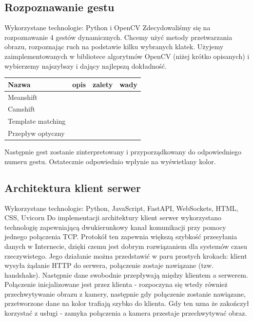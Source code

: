 \documentclass{article}
\begin{document}
\subsection{Rozpoznawanie gestu}
Wykorzystane technologie: Python i OpenCV
Zdecydowaliśmy się na rozpoznawanie 4 gestów dynamicznych. Chcemy użyć metody przetwarzania obrazu, rozpoznając ruch na podstawie kilku wybranych klatek. Użyjemy zaimplementowanych w bibliotece algorytmów OpenCV (niżej krótko opisanych)  i wybierzemy najszybszy i dający najlepszą dokładność.
\begin{table}[H]
\begin{tabular}{|l|l|l|l|}
\hline
Nazwa             & opis & zalety & wady \\ \hline
Meanshift         &      &        &      \\ \hline
Camshift          &      &        &      \\ \hline
Template matching &      &        &      \\ \hline
Przepływ optyczny &      &        &      \\ \hline

\end{tabular}
\centering
\end{table}
Następnie gest zostanie zinterpretowany i przyporządkowany do odpowiedniego numeru gestu. Ostatecznie odpowiednio wpłynie na wyświetlany kolor.
\subsection{Architektura klient serwer}
Wykorzystane technologie: Python, JavaScript, FastAPI, WebSockets, HTML, CSS, Uvicorn
Do implementacji architektury klient serwer wykorzystano technologię zapewniającą dwukierunkowy kanał komunikacji przy pomocy jednego połączenia TCP. Protokół ten zapewnia większą szybkość przesyłania danych w Internecie, dzięki czemu jest dobrym rozwiązaniem dla systemów czasu rzeczywistego. Jego działanie można przedstawić w paru prostych krokach: klient wysyła żądanie HTTP do serwera, połączenie zostaje nawiązane (tzw. handshake). Następnie dane swobodnie przepływają między klientem a serwerem. Połączenie inicjalizowane jest przez klienta - rozpoczyna się wtedy również przechwytywanie obrazu z kamery, następnie gdy połączenie zostanie nawiązane, przetworzone dane na kolor trafiają szybko do klienta. Gdy ten uzna że zakończył korzystać z usługi - zamyka połączenia a kamera przestaje przechwytywać obraz. 
\end{document}
